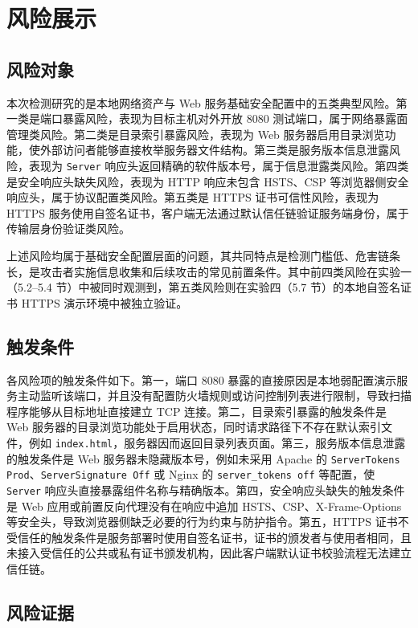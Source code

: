 \documentclass[12pt,a4paper,fontset=none]{ctexart}
\begin{document}
\section{风险展示}

\subsection{风险对象}

本次检测研究的是本地网络资产与 Web 服务基础安全配置中的五类典型风险。第一类是端口暴露风险，表现为目标主机对外开放 8080 测试端口，属于网络暴露面管理类风险。第二类是目录索引暴露风险，表现为 Web 服务器启用目录浏览功能，使外部访问者能够直接枚举服务器文件结构。第三类是服务版本信息泄露风险，表现为 \texttt{Server} 响应头返回精确的软件版本号，属于信息泄露类风险。第四类是安全响应头缺失风险，表现为 HTTP 响应未包含 HSTS、CSP 等浏览器侧安全响应头，属于协议配置类风险。第五类是 HTTPS 证书可信性风险，表现为 HTTPS 服务使用自签名证书，客户端无法通过默认信任链验证服务端身份，属于传输层身份验证类风险。

上述风险均属于基础安全配置层面的问题，其共同特点是检测门槛低、危害链条长，是攻击者实施信息收集和后续攻击的常见前置条件。其中前四类风险在实验一（5.2--5.4 节）中被同时观测到，第五类风险则在实验四（5.7 节）的本地自签名证书 HTTPS 演示环境中被独立验证。

\subsection{触发条件}

各风险项的触发条件如下。第一，端口 8080 暴露的直接原因是本地弱配置演示服务主动监听该端口，并且没有配置防火墙规则或访问控制列表进行限制，导致扫描程序能够从目标地址直接建立 TCP 连接。第二，目录索引暴露的触发条件是 Web 服务器的目录浏览功能处于启用状态，同时请求路径下不存在默认索引文件，例如 \texttt{index.html}，服务器因而返回目录列表页面。第三，服务版本信息泄露的触发条件是 Web 服务器未隐藏版本号，例如未采用 Apache 的 \texttt{ServerTokens Prod}、\texttt{ServerSignature Off} 或 Nginx 的 \texttt{server\_tokens off} 等配置，使 \texttt{Server} 响应头直接暴露组件名称与精确版本。第四，安全响应头缺失的触发条件是 Web 应用或前置反向代理没有在响应中追加 HSTS、CSP、X-Frame-Options 等安全头，导致浏览器侧缺乏必要的行为约束与防护指令。第五，HTTPS 证书不受信任的触发条件是服务部署时使用自签名证书，证书的颁发者与使用者相同，且未接入受信任的公共或私有证书颁发机构，因此客户端默认证书校验流程无法建立信任链。

\subsection{风险证据}
\end{document}
